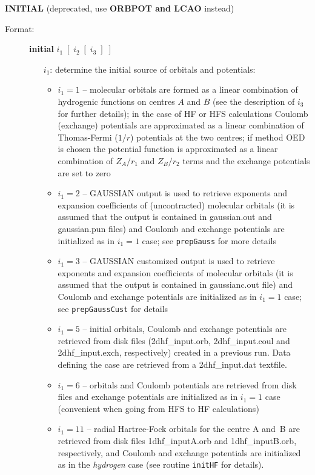 \documentclass[12pt,a4paper]{article}
\newcommand{\ft}[1]{\texttt{#1}}
\begin{document}
\begin{description} 
\item \textbf{INITIAL} (deprecated, use \textbf{ORBPOT and LCAO} instead)
\begin{description} 
\item[Format:] \textbf{initial} $i_1\;[\;i_2\;[\;i_3\;]\;]$  
\begin{itemize} 
\item[$i_1$:] determine the initial source of orbitals and potentials:
\begin{itemize}
\item $i_1=1$ --   molecular orbitals are formed as a linear
  combination of hydrogenic functions on centres $A$ and $B$ (see
  the description of $i_3$ for further details); 
  in the case of HF or HFS calculations Coulomb
  (exchange) potentials are approximated as a linear combination of 
  Thomas-Fermi ($1/r$) potentials at the two centres; if method OED is
  chosen the potential function is approximated as a linear
  combination of $Z_A/r_1$ and $Z_B/r_2$ terms and the exchange
  potentials are set to zero

\item $i_1=2$ -- GAUSSIAN output is used to retrieve exponents and expansion coefficients
  of (uncontracted) molecular orbitals (it is assumed that the output is contained in
  gaussian.out and gaussian.pun files) and Coulomb and exchange potentials are initialized
  as in $i_1=1$ case; see \ft{prepGauss} for more details

\item $i_1=3$ -- GAUSSIAN customized output is used to retrieve exponents and expansion
  coefficients of molecular orbitals (it is assumed that the output is contained in
  gaussianc.out file) and Coulomb and exchange potentials are initialized as in $i_1=1$
  case; see \ft{prepGaussCust} for details

\item $i_1=5$ -- initial orbitals, Coulomb and exchange potentials are retrieved from disk
  files (2dhf\_input.orb, 2dhf\_input.coul and 2dhf\_input.exch, respectively) created in
  a previous run. Data defining the case are retrieved from a 2dhf\_input.\-dat textfile.

\item $i_1=6$ -- orbitals and Coulomb potentials are retrieved from disk files and
  exchange potentials are initialized as in $i_1=1$ case (convenient when going from HFS
  to HF calculations)

\item $i_1=11$ -- radial Hartree-Fock orbitals for the centre A and~B are retrieved from
  disk files 1dhf\_inputA.orb and 1dhf\_inputB.orb, respectively, and Coulomb and exchange
  potentials are initialized as in the \textsl{hydrogen} case (see routine \ft{initHF} for
  details).


\end{itemize}
\end{itemize}
\end{description}
\end{description}
\end{document}
